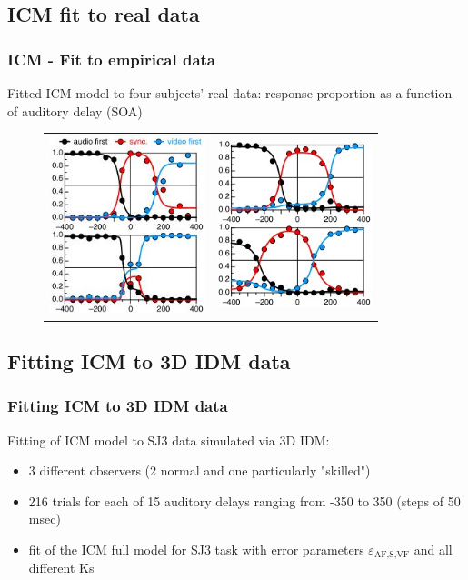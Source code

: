 \documentclass[xcolor={fixpdftex,hyperref,x11names},10pt,pdftex,hyperref={pdftex}]{beamer}
\begin{document}
\subsection{ICM fit to real data}

\begin{frame}
  \frametitle{ICM - Fit to empirical data}
  Fitted ICM model to four subjects' real data: response proportion
  as a function of auditory delay (SOA)
   \begin{figure}[h]
      \begin{tabular}{c c}
      \includegraphics[width=45mm,totalheight=0.4\textheight]{figs/SJ3_Figure4a.jpg}
      &
      \includegraphics[width=45mm,totalheight=0.4\textheight]{figs/SJ3_Figure4b.jpg}
       \end{tabular}
   \end{figure}
\end{frame} 


\subsection{Fitting ICM to 3D IDM data}

\begin{frame}
  \frametitle{Fitting ICM to 3D IDM data}
  Fitting of ICM model to SJ3 data simulated via 3D IDM: 
  \begin{itemize}
   \item 3 different observers (2 normal and one particularly "skilled")
   \item 216 trials for each of 15 auditory delays ranging from -350 to 350 (steps of 50 msec)
   \item fit of the ICM full model for SJ3 task with error 
   parameters $\varepsilon_\text{AF,S,VF}$ and all different Ks 
  \end{itemize}
\end{frame}
\end{document}
